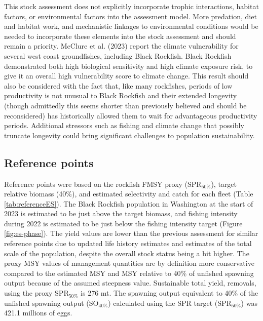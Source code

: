 \documentclass[11pt,
  english,
  letterpaper,
]{article}
\begin{document}
This stock assessment does not explicitly incorporate trophic interactions, habitat factors, or environmental factors into the assessment model. More predation, diet and habitat work, and mechanistic linkages to environmental conditions would be needed to incorporate these elements into the stock assessment and should remain a priority. McClure et al. (2023) report the climate vulnerability for several west coast groundfishes, including Black Rockfish. Black Rockfish demonstrated both high biological sensitivity and high climate exposure risk, to give it an overall high vulnerability score to climate change. This result should also be considered with the fact that, like many rockfishes, periods of low productivity is not unusual to Black Rockfish and their extended longevity (though admittedly this seems shorter than previously believed and should be reconsidered) has historically allowed them to wait for advantageous productivity periods. Additional stressors such as fishing and climate change that possibly truncate longevity could bring significant challenges to population sustainability.

\hypertarget{reference-points}{%
\subsection*{Reference points}\label{reference-points}}

Reference points were based on the rockfish FMSY proxy (\(\text{SPR}_{50\%}\)), target relative biomass (40\%), and estimated selectivity and catch for each fleet (Table \ref{tab:referenceES}). The Black Rockfish population in Washington at the start of 2023 is estimated to be just above the target biomass, and fishing intensity during 2022 is estimated to be just below the fishing intensity target (Figure \ref{fig:es-phase}). The yield values are lower than the previous assessment for similar reference points due to updated life history estimates and estimates of the total scale of the population, despite the overall stock status being a bit higher. The proxy MSY values of management quantities are by definition more conservative compared to the estimated MSY and MSY relative to 40\% of unfished spawning output because of the assumed steepness value. Sustainable total yield, removals, using the proxy \(\text{SPR}_{50\%}\) is 276 mt. The spawning output equivalent to 40\% of the unfished spawning output (\(\text{SO}_{40\%}\)) calculated using the SPR target (\(\text{SPR}_{50\%}\)) was 421.1 millions of eggs.
\end{document}

